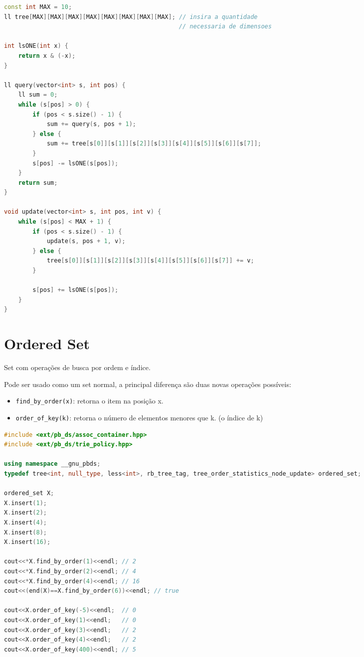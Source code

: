 \documentclass[11pt, a4paper, oneside]{book}
\begin{document}
\begin{multicols}{2}
\begin{lstlisting}[language=C++]
const int MAX = 10;
ll tree[MAX][MAX][MAX][MAX][MAX][MAX][MAX][MAX]; // insira a quantidade
                                                 // necessaria de dimensoes

int lsONE(int x) {
    return x & (-x);
}

ll query(vector<int> s, int pos) {
    ll sum = 0;
    while (s[pos] > 0) {
        if (pos < s.size() - 1) {
            sum += query(s, pos + 1);
        } else {
            sum += tree[s[0]][s[1]][s[2]][s[3]][s[4]][s[5]][s[6]][s[7]];
        }
        s[pos] -= lsONE(s[pos]);
    }
    return sum;
}

void update(vector<int> s, int pos, int v) {
    while (s[pos] < MAX + 1) {
        if (pos < s.size() - 1) {
            update(s, pos + 1, v);
        } else {
            tree[s[0]][s[1]][s[2]][s[3]][s[4]][s[5]][s[6]][s[7]] += v;
        }

        s[pos] += lsONE(s[pos]);
    }
}\end{lstlisting}
\end{multicols}

\hfill

\section{Ordered Set}


Set com operações de busca por ordem e índice.



Pode ser usado como um set normal, a principal diferença são duas novas operações possíveis:



\begin{itemize}
\item \lstinline{find_by_order(x)}: retorna o item na posição x.
\item \lstinline{order_of_key(k)}: retorna o número de elementos menores que k. (o índice de k)
\end{itemize}



\textbf{} 
\begin{lstlisting}[language=C++]
#include <ext/pb_ds/assoc_container.hpp>
#include <ext/pb_ds/trie_policy.hpp>

using namespace __gnu_pbds;
typedef tree<int, null_type, less<int>, rb_tree_tag, tree_order_statistics_node_update> ordered_set;

ordered_set X;
X.insert(1);
X.insert(2);
X.insert(4);
X.insert(8);
X.insert(16);

cout<<*X.find_by_order(1)<<endl; // 2
cout<<*X.find_by_order(2)<<endl; // 4
cout<<*X.find_by_order(4)<<endl; // 16
cout<<(end(X)==X.find_by_order(6))<<endl; // true

cout<<X.order_of_key(-5)<<endl;  // 0
cout<<X.order_of_key(1)<<endl;   // 0
cout<<X.order_of_key(3)<<endl;   // 2
cout<<X.order_of_key(4)<<endl;   // 2
cout<<X.order_of_key(400)<<endl; // 5

\end{lstlisting}
\end{document}
